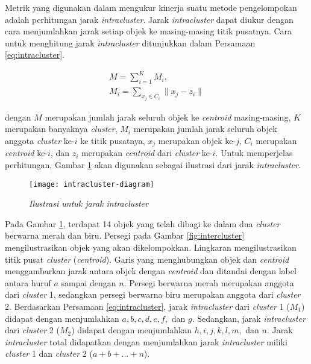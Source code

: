 Metrik yang digunakan \cite{maulik2000genetic} dalam mengukur kinerja suatu metode pengelompokan adalah perhitungan jarak \textit{intracluster}. Jarak \textit{intracluster} dapat diukur dengan cara menjumlahkan jarak setiap objek ke masing-masing titik pusatnya. Cara untuk menghitung jarak \textit{intracluster} ditunjukkan dalam Persamaan \ref{eq:intracluster}.

\begin{equation}
\label{eq:intracluster}
	\begin{gathered}
	M=\sum_{i=1}^K M_i , \\
	M_i=\sum_{x_j\in C_i}\parallel x_j-z_i\parallel
	\end{gathered}
\end{equation}

dengan $M$ merupakan jumlah jarak seluruh objek ke \textit{centroid} masing-masing, $K$ merupakan banyaknya \textit{cluster}, $M_i$ merupakan jumlah jarak seluruh objek anggota \textit{cluster} ke-$i$ ke titik pusatnya, $x_j$ merupakan objek ke-$j$, $C_i$ merupakan \textit{centroid} ke-$i$, dan $z_i$ merupakan \textit{centroid} dari \textit{cluster} ke-$i$. Untuk memperjelas perhitungan, Gambar \ref{fig:intracluster} akan digunakan sebagai ilustrasi dari jarak \textit{intracluster}.

\begin{figure}[h]
	\begin{center}
		\texttt{[image: intracluster-diagram]}
		\caption{\textit{Ilustrasi untuk jarak \textit{intracluster}}}
		\label{fig:intracluster}
	\end{center}
\end{figure}

Pada Gambar \ref{fig:intracluster}, terdapat 14 objek yang telah dibagi ke dalam dua \textit{cluster} berwarna merah dan biru. Persegi pada Gambar \ref{fig:intercluster} mengilustrasikan objek yang akan dikelompokkan. Lingkaran mengilustrasikan titik pusat \textit{cluster} (\textit{centroid}). Garis yang menghubungkan objek dan \textit{centroid} menggambarkan jarak antara objek dengan \textit{centroid} dan ditandai dengan label antara huruf $a$ sampai dengan $n$. Persegi berwarna merah merupakan anggota dari \textit{cluster} 1, sedangkan persegi berwarna biru merupakan anggota dari \textit{cluster} 2. Berdasarkan Persamaan \ref{eq:intracluster}, jarak \textit{intracluster} dari \textit{cluster} 1 ($M_1$) didapat dengan menjumlahkan $a, b, c, d, e, f,$ dan $g$. Sedangkan, jarak \textit{intracluster} dari \textit{cluster} 2 ($M_2$) didapat dengan menjumlahkan $h, i, j, k, l, m,$ dan $n$. Jarak \textit{intracluster} total didapatkan dengan menjumlahkan jarak \textit{intracluster} miliki \textit{cluster} 1 dan \textit{cluster} 2 ($a + b + ... + n$).

